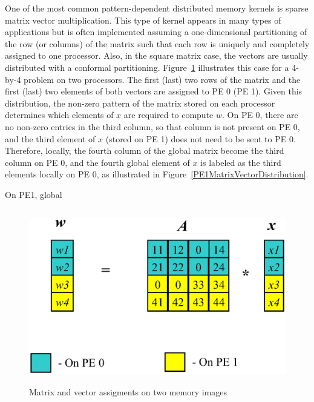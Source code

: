 \documentclass[12pt,relax]{PetraObjectModel}
\begin{document}
One of the most common pattern-dependent distributed memory 
kernels is sparse matrix vector multiplication.
This type of kernel appears in many types of applications but 
is often implemented assuming a
one-dimensional partitioning of the row (or columns) of the 
matrix such that each row is uniquely and
completely assigned to one processor.  Also, in the square 
matrix case, the vectors are usually distributed
with a conformal partitioning.  Figure~\ref{MatrixVectorDistribution} 
illustrates this case for a 4-by-4
problem on two processors.  The first (last) two rows of 
the matrix and the first (last) two elements of 
both vectors are assigned to PE 0 (PE 1).  Given this 
distribution, the non-zero pattern of the matrix stored
on each processor determines which elements of $x$ are 
required to compute $w$.  On PE 0, there are no
non-zero entries in the third column, so that column is 
not present on PE 0, and the third element of $x$
(stored on PE 1) does not need to be sent to PE 0.  
Therefore, locally, the fourth
column of the global matrix become the third column on 
PE 0, and the fourth global element of $x$ is labeled
as the third elements locally on PE 0, as illustrated 
in Figure~\ref{PE1MatrixVectorDistribution}.

On PE1, global

\begin{figure} 
\begin{center} 
\includegraphics[height=3in]{TwoPESpMV}
\end{center} 
\label{MatrixVectorDistribution}
\caption{Matrix and vector assigments on two memory images}
\end{figure} 
\end{document}
